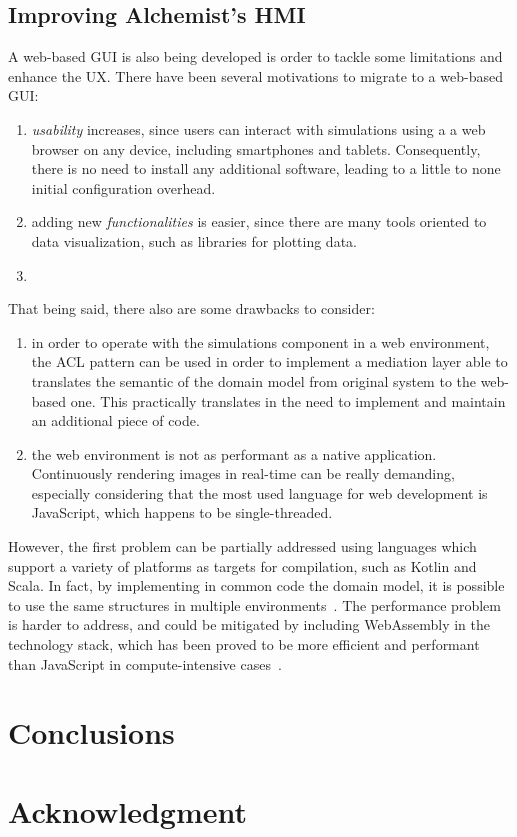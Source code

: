 \documentclass[conference]{IEEEtran}
\begin{document}
\subsection{Improving Alchemist's \ac{HMI}}
A web-based \ac{GUI} is also being developed is order to tackle some limitations and enhance the \ac{UX}.
%
There have been several motivations to migrate to a web-based \ac{GUI}:
\begin{enumerate}
    \item \emph{usability} increases,
    since users can interact with simulations using a a web browser on any device,
    including smartphones and tablets.
    Consequently,
    there is no need to install any additional software,
    leading to a little to none initial configuration overhead.
    \item adding new \emph{functionalities} is easier,
    since there are many tools oriented to data visualization,
    such as libraries for plotting data.
    \item
\end{enumerate}
That being said,
there also are some drawbacks to consider:
\begin{enumerate}
    \item in order to operate with the simulations component in a web environment,
    the \ac{ACL} pattern can be used in order to implement a mediation layer able to translates the semantic of the domain model from original system to the web-based one.
    This practically translates in the need to implement and maintain an additional piece of code.
    \item the web environment is not as performant as a native application.
    Continuously rendering images in real-time can be really demanding,
    especially considering that the most used language for web development is JavaScript,
    which happens to be single-threaded.
\end{enumerate}

However,
the first problem can be partially addressed using languages which support a  variety of platforms as targets for compilation,
such as Kotlin and Scala.
%
In fact,
by implementing in common code the domain model,
it is possible to use the same structures in multiple environments~\cite{DBLP:conf/dais/FilasetaP23}.
%
The performance problem is harder to address,
and could be mitigated by including WebAssembly in the technology stack,
which has been proved to be more efficient and performant than JavaScript in compute-intensive cases~\cite{DBLP:conf/ict4s/Macedo0PS22}.
%
\section{Conclusions}

\section*{Acknowledgment}



\vspace{12pt}
\end{document}
